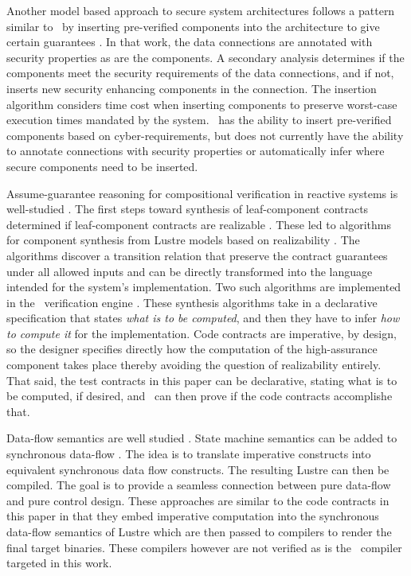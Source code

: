 
Another model based approach to secure system architectures follows a pattern similar to \brfcs\ by inserting pre-verified components into the architecture to give certain guarantees \cite{6209212}.
In that work, the data connections are annotated with security properties as are the components.
A secondary analysis determines if the components meet the security requirements of the data connections, and if not, inserts new security enhancing components in the connection.
The insertion algorithm considers time cost when inserting components to preserve worst-case execution times mandated by the system.
\brfcs\ has the ability to insert pre-verified components based on cyber-requirements, but does not currently have the ability to annotate connections with security properties or automatically infer where secure components need to be inserted. 

Assume-guarantee reasoning for compositional verification in reactive systems is well-studied \cite{10.1007/978-3-642-28891-3_13, 10.1145/2658982.2527272, 10.1007/978-3-319-17524-9_7}.
The first steps toward synthesis of leaf-component contracts determined if leaf-component contracts are realizable \cite{10.1007/978-3-319-17524-9_13, 10.1007/978-3-319-29613-5_7}.
These led to algorithms for component synthesis from Lustre models based on realizability \cite{katis2017synthesis, 10.1007/978-3-319-89963-3_10}.
The algorithms discover a transition relation that preserve the contract guarantees under all allowed inputs and can be directly transformed into the language intended for the system's implementation.
Two such algorithms are implemented in the \agr\ verification engine \cite{jkind}.
These synthesis algorithms take in a declarative specification that states \emph{what is to be computed}, and then they have to infer \emph{how to compute it} for the implementation.
Code contracts are imperative, by design, so the designer specifies directly how the computation of the high-assurance component takes place thereby avoiding the question of realizability entirely.
That said, the test contracts in this paper can be declarative, stating what is to be computed, if desired, and \agr\ can then prove if the code contracts accomplishe that.

Data-flow semantics are well studied \cite{10.1145/41625.41641,97300,
10.1145/1379023.1375674,10.1145/2345141.2248426,10.1007/978-3-540-45212-6_10}.
State machine semantics can be added to synchronous
data-flow \cite{10.1145/1086228.1086261}. The idea is to translate
imperative constructs into equivalent synchronous data flow
constructs. The resulting Lustre can then be compiled. The goal is to
provide a seamless connection between pure data-flow and pure control
design.
These approaches are similar to the code contracts in this paper in that they embed imperative computation into the synchronous data-flow semantics of Lustre which are then passed to compilers to render the final target binaries.
These compilers however are not verified as is the \ckml\ compiler targeted in this work.

